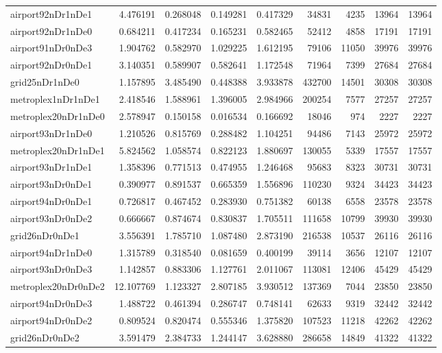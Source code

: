 \documentclass[../../../thesis.tex]{subfiles}
\begin{document}
\begin{longtable}{|l|r|r|r|r|r|r|r|r|}
airport92nDr1nDe1 & 4.476191 & 0.268048 & 0.149281 & 0.417329 & 34831 & 4235 & 13964 & 13964 \\
airport92nDr1nDe0 & 0.684211 & 0.417234 & 0.165231 & 0.582465 & 52412 & 4858 & 17191 & 17191 \\
airport91nDr0nDe3 & 1.904762 & 0.582970 & 1.029225 & 1.612195 & 79106 & 11050 & 39976 & 39976 \\
airport92nDr0nDe1 & 3.140351 & 0.589907 & 0.582641 & 1.172548 & 71964 & 7399 & 27684 & 27684 \\
grid25nDr1nDe0 & 1.157895 & 3.485490 & 0.448388 & 3.933878 & 432700 & 14501 & 30308 & 30308 \\
metroplex1nDr1nDe1 & 2.418546 & 1.588961 & 1.396005 & 2.984966 & 200254 & 7577 & 27257 & 27257 \\
metroplex20nDr1nDe0 & 2.578947 & 0.150158 & 0.016534 & 0.166692 & 18046 & 974 & 2227 & 2227 \\
airport93nDr1nDe0 & 1.210526 & 0.815769 & 0.288482 & 1.104251 & 94486 & 7143 & 25972 & 25972 \\
metroplex20nDr1nDe1 & 5.824562 & 1.058574 & 0.822123 & 1.880697 & 130055 & 5339 & 17557 & 17557 \\
airport93nDr1nDe1 & 1.358396 & 0.771513 & 0.474955 & 1.246468 & 95683 & 8323 & 30731 & 30731 \\
airport93nDr0nDe1 & 0.390977 & 0.891537 & 0.665359 & 1.556896 & 110230 & 9324 & 34423 & 34423 \\
airport94nDr0nDe1 & 0.726817 & 0.467452 & 0.283930 & 0.751382 & 60138 & 6558 & 23578 & 23578 \\
airport93nDr0nDe2 & 0.666667 & 0.874674 & 0.830837 & 1.705511 & 111658 & 10799 & 39930 & 39930 \\
grid26nDr0nDe1 & 3.556391 & 1.785710 & 1.087480 & 2.873190 & 216538 & 10537 & 26116 & 26116 \\
airport94nDr1nDe0 & 1.315789 & 0.318540 & 0.081659 & 0.400199 & 39114 & 3656 & 12107 & 12107 \\
airport93nDr0nDe3 & 1.142857 & 0.883306 & 1.127761 & 2.011067 & 113081 & 12406 & 45429 & 45429 \\
metroplex20nDr0nDe2 & 12.107769 & 1.123327 & 2.807185 & 3.930512 & 137369 & 7044 & 23850 & 23850 \\
airport94nDr0nDe3 & 1.488722 & 0.461394 & 0.286747 & 0.748141 & 62633 & 9319 & 32442 & 32442 \\
airport94nDr0nDe2 & 0.809524 & 0.820474 & 0.555346 & 1.375820 & 107523 & 11218 & 42262 & 42262 \\
grid26nDr0nDe2 & 3.591479 & 2.384733 & 1.244147 & 3.628880 & 286658 & 14849 & 41322 & 41322 \\

\end{longtable}
\end{document}
